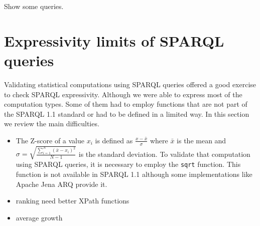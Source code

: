 Show some queries.

\section{Expressivity limits of SPARQL queries}

Validating statistical computations using SPARQL queries offered 
 a good exercise to check SPARQL expressivity. Although we were able 
 to express most of the computation types. 
Some of them had to employ functions that are not part of the SPARQL 1.1
standard or had to be defined in a limited way. In this section we review 
the main difficulties.

\begin{itemize} 

\item The Z-score of a value $x_i$ is defined as $\frac{x - \bar{x}}{\sigma}$
where $\bar{x}$ is the mean and $\sigma=\sqrt{\frac{\sum_{i=1}^{N}(\bar{x}-x_i)^2}{N -
1}}$ is the standard deviation. To validate that computation using SPARQL
queries, it is necessary to employ the \lstinline|sqrt| function. 
This function is not available in SPARQL 1.1 although some implementations 
 like Apache Jena ARQ provide it.

\item 
ranking need better XPath functions

\item average growth

\end{itemize}
